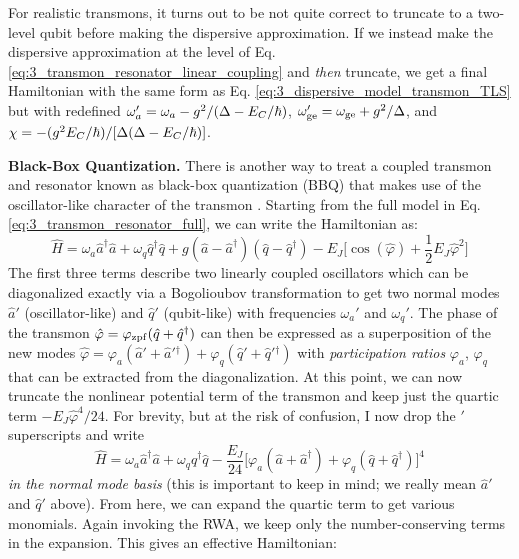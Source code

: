 For realistic transmons, it turns out to be not quite correct to truncate to a two-level qubit before making the dispersive approximation. If we instead make the dispersive approximation at the level of Eq. \eqref{eq:3_transmon_resonator_linear_coupling} and \textit{then} truncate, we get a final Hamiltonian with the same form as Eq. \eqref{eq:3_dispersive_model_transmon_TLS} but with redefined $\omega_a' = \omega_a - g^2/(\Delta - E_C/\hbar)$, $\omega_{\rm ge}' = \omega_{\rm ge} + g^2/\Delta$, and $\chi = - (g^2E_C/\hbar) / [\Delta(\Delta - E_C/\hbar)]$. 

\noindent\textbf{Black-Box Quantization.} There is another way to treat a coupled transmon and resonator known as black-box quantization (BBQ) that makes use of the oscillator-like character of the transmon \cite{nigg2012black}. Starting from the full model in Eq. \eqref{eq:3_transmon_resonator_full}, we can write the Hamiltonian as:
\begin{equation}
    \hat{H} = \omega_a \hat{a}^\dagger\hat{a} + \omega_q \hat{q}^\dagger\hat{q} + g(\hat{a}-\hat{a}^\dagger)(\hat{q}-\hat{q}^\dagger) - E_J\bigg[\cos(\hat{\varphi}) + \frac{1}{2}E_J \hat{\varphi}^2\bigg]
\end{equation}
The first three terms describe two linearly coupled oscillators which can be diagonalized exactly via a Bogolioubov transformation to get two normal modes $\hat{a}'$ (oscillator-like) and $\hat{q}'$ (qubit-like) with frequencies $\omega_a'$ and $\omega_q'$. The phase of the transmon $\hat{\varphi} = \varphi_{\rm zpf}(\hat{q} + \hat{q}^\dagger)$ can then be expressed as a superposition of the new modes $\hat{\varphi} = \varphi_a(\hat{a}' + \hat{a}'{}^\dagger) + \varphi_q(\hat{q}' + \hat{q}'{}^\dagger)$ with \textit{participation ratios} $\varphi_a$, $\varphi_q$ that can be extracted from the diagonalization. At this point, we can now truncate the nonlinear potential term of the transmon and keep just the quartic term $-E_J\hat{\varphi}^4/24$. For brevity, but at the risk of confusion, I now drop the $'$ superscripts and write
\begin{equation}
    \hat{H} = \omega_a \hat{a}^\dagger\hat{a} + \omega_q \hat{q}^\dagger\hat{q} - \frac{E_J}{24}\big[\varphi_{a}(\hat{a} + \hat{a}^\dagger) + \varphi_{q}(\hat{q} + \hat{q}^\dagger)\big]^4
\end{equation}
\textit{in the normal mode basis} (this is important to keep in mind; we really mean $\hat{a}'$ and $\hat{q}'$ above). From here, we can expand the quartic term to get various monomials. Again invoking the RWA, we keep only the number-conserving terms in the expansion. This gives an effective Hamiltonian:
